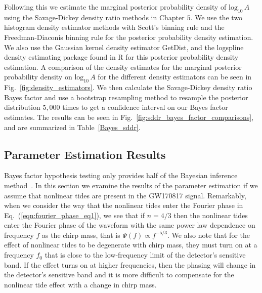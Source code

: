 Following this we estimate the marginal posterior probability density of $\mathrm{log}_{10} \, A$ using the Savage-Dickey density ratio methods in Chapter $5$. We use the two histogram density estimator methods with Scott's binning rule and the Freedman-Diaconis binning rule for the posterior probability density estimation. We also use the Gaussian kernel density estimator GetDist, and the logspline density estimating package found in R for this posterior probability density estimation. A comparison of the density estimates for the marginal posterior probability density on $\mathrm{log}_{10} \, A$ for the different density estimators can be seen in Fig.~\ref{fig:density_estimators}. We then calculate the Savage-Dickey density ratio Bayes factor and use a bootstrap resampling method to resample the posterior distribution $5,000$ times to get a confidence interval on our Bayes factor estimates. The results can be seen in Fig.~\ref{fig:sddr_bayes_factor_comparisons}, and are summarized in Table~\ref{Bayes_sddr}.

\subsection{Parameter Estimation Results}
Bayes factor hypothesis testing only provides half of the Bayesian inference method~\cite{read2006encyclopedia}. In this section we examine the results of the parameter estimation if we assume that nonlinear tides are present in the GW170817 signal. Remarkably, when we consider the way that the nonlinear tides enter the Fourier phase in Eq.~(\ref{eqn:fourier_phase_eq1}), we see that if $n = 4/3$ then the nonlinear tides enter the Fourier phase of the waveform with the same power law dependence on frequency $f$ as the chirp mass, that is $\Psi(f) \propto f^{-5/3}$. We also note that for the effect of nonlinear tides to be degenerate with chirp mass, they must turn on at a frequency $f_0$ that is close to the low-frequency limit of the detector's sensitive band. If the effect turns on at higher frequencies, then the phasing will change in the detector's sensitive band and it is more difficult to compensate for the nonlinear tide effect with a change in chirp mass. 

